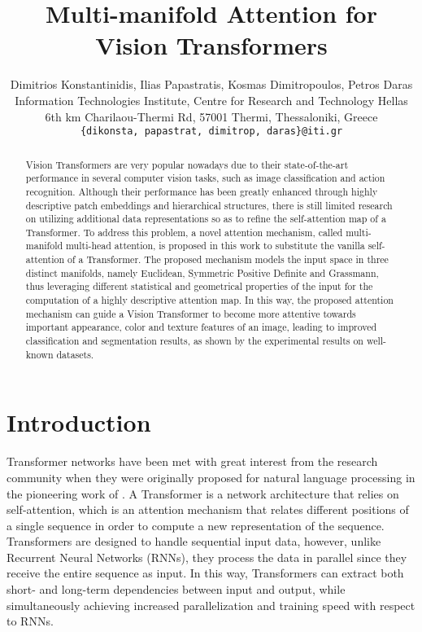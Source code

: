 \documentclass[10pt,twocolumn,letterpaper]{article}
\begin{document}
\title{Multi-manifold Attention for Vision Transformers}

\author{Dimitrios Konstantinidis, Ilias Papastratis, Kosmas Dimitropoulos, Petros Daras\\
Information Technologies Institute, Centre for Research and Technology Hellas\\
6th km Charilaou-Thermi Rd, 57001 Thermi, Thessaloniki, Greece\\
{\tt\small \{dikonsta, papastrat, dimitrop, daras\}@iti.gr}
}
\maketitle

\begin{abstract}
Vision Transformers are very popular nowadays due to their state-of-the-art performance in several computer vision tasks, such as image classification and action recognition. Although their performance has been greatly enhanced through highly descriptive patch embeddings and hierarchical structures, there is still limited research on utilizing additional data representations so as to refine the self-attention map of a Transformer. To address this problem, a novel attention mechanism, called multi-manifold multi-head attention, is proposed in this work to substitute the vanilla self-attention of a Transformer. The proposed mechanism models the input space in three distinct manifolds, namely Euclidean, Symmetric Positive Definite and Grassmann, thus leveraging different statistical and geometrical properties of the input for the computation of a highly descriptive attention map. In this way, the proposed attention mechanism can guide a Vision Transformer to become more attentive towards important appearance, color and texture features of an image, leading to improved classification and segmentation results, as shown by the experimental results on well-known datasets.
\end{abstract}

\section{Introduction}
\label{sec:intro}

Transformer networks have been met with great interest from the research community when they were originally proposed for natural language processing in the pioneering work of \cite{Author28}. A Transformer is a network architecture that relies on self-attention, which is an attention mechanism that relates different positions of a single sequence in order to compute a new representation of the sequence. Transformers are designed to handle sequential input data, however, unlike Recurrent Neural Networks (RNNs), they process the data in parallel since they receive the entire sequence as input. In this way, Transformers can extract both short- and long-term dependencies between input and output, while simultaneously achieving increased parallelization and training speed with respect to RNNs.
\end{document}
